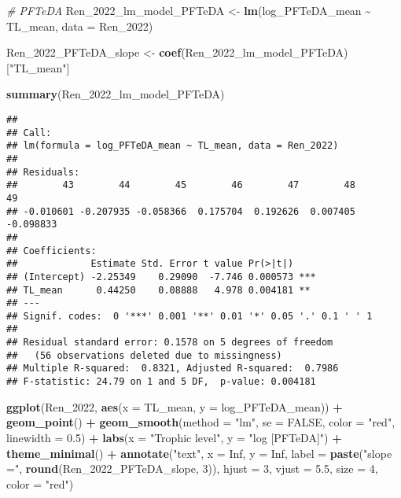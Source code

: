 \documentclass[
]{article}
\newenvironment{Shaded}{\begin{snugshade}}{\end{snugshade}}
\newcommand{\AttributeTok}[1]{\textcolor[rgb]{0.13,0.29,0.53}{#1}}
\newcommand{\CommentTok}[1]{\textcolor[rgb]{0.56,0.35,0.01}{\textit{#1}}}
\newcommand{\ConstantTok}[1]{\textcolor[rgb]{0.56,0.35,0.01}{#1}}
\newcommand{\DecValTok}[1]{\textcolor[rgb]{0.00,0.00,0.81}{#1}}
\newcommand{\FloatTok}[1]{\textcolor[rgb]{0.00,0.00,0.81}{#1}}
\newcommand{\FunctionTok}[1]{\textcolor[rgb]{0.13,0.29,0.53}{\textbf{#1}}}
\newcommand{\NormalTok}[1]{#1}
\newcommand{\OtherTok}[1]{\textcolor[rgb]{0.56,0.35,0.01}{#1}}
\newcommand{\SpecialCharTok}[1]{\textcolor[rgb]{0.81,0.36,0.00}{\textbf{#1}}}
\newcommand{\StringTok}[1]{\textcolor[rgb]{0.31,0.60,0.02}{#1}}
\begin{document}
\begin{Shaded}
\begin{Highlighting}[]
\CommentTok{\# PFTeDA}
\NormalTok{Ren\_2022\_lm\_model\_PFTeDA }\OtherTok{\textless{}{-}} \FunctionTok{lm}\NormalTok{(log\_PFTeDA\_mean }\SpecialCharTok{\textasciitilde{}}\NormalTok{ TL\_mean,}
                              \AttributeTok{data =}\NormalTok{ Ren\_2022)}

\NormalTok{Ren\_2022\_PFTeDA\_slope }\OtherTok{\textless{}{-}} \FunctionTok{coef}\NormalTok{(Ren\_2022\_lm\_model\_PFTeDA)[}\StringTok{"TL\_mean"}\NormalTok{]}

\FunctionTok{summary}\NormalTok{(Ren\_2022\_lm\_model\_PFTeDA)}
\end{Highlighting}
\end{Shaded}

\begin{verbatim}
## 
## Call:
## lm(formula = log_PFTeDA_mean ~ TL_mean, data = Ren_2022)
## 
## Residuals:
##        43        44        45        46        47        48        49 
## -0.010601 -0.207935 -0.058366  0.175704  0.192626  0.007405 -0.098833 
## 
## Coefficients:
##             Estimate Std. Error t value Pr(>|t|)    
## (Intercept) -2.25349    0.29090  -7.746 0.000573 ***
## TL_mean      0.44250    0.08888   4.978 0.004181 ** 
## ---
## Signif. codes:  0 '***' 0.001 '**' 0.01 '*' 0.05 '.' 0.1 ' ' 1
## 
## Residual standard error: 0.1578 on 5 degrees of freedom
##   (56 observations deleted due to missingness)
## Multiple R-squared:  0.8321, Adjusted R-squared:  0.7986 
## F-statistic: 24.79 on 1 and 5 DF,  p-value: 0.004181
\end{verbatim}

\begin{Shaded}
\begin{Highlighting}[]
\FunctionTok{ggplot}\NormalTok{(Ren\_2022, }\FunctionTok{aes}\NormalTok{(}\AttributeTok{x =}\NormalTok{ TL\_mean, }\AttributeTok{y =}\NormalTok{ log\_PFTeDA\_mean)) }\SpecialCharTok{+}
  \FunctionTok{geom\_point}\NormalTok{() }\SpecialCharTok{+}
  \FunctionTok{geom\_smooth}\NormalTok{(}\AttributeTok{method =} \StringTok{"lm"}\NormalTok{, }\AttributeTok{se =} \ConstantTok{FALSE}\NormalTok{, }\AttributeTok{color =} \StringTok{"red"}\NormalTok{, }\AttributeTok{linewidth =} \FloatTok{0.5}\NormalTok{) }\SpecialCharTok{+}
  \FunctionTok{labs}\NormalTok{(}\AttributeTok{x =} \StringTok{"Trophic level"}\NormalTok{,}
       \AttributeTok{y =} \StringTok{"log [PFTeDA]"}\NormalTok{) }\SpecialCharTok{+}
  \FunctionTok{theme\_minimal}\NormalTok{() }\SpecialCharTok{+}
  \FunctionTok{annotate}\NormalTok{(}\StringTok{"text"}\NormalTok{, }\AttributeTok{x =} \ConstantTok{Inf}\NormalTok{, }\AttributeTok{y =} \ConstantTok{Inf}\NormalTok{, }\AttributeTok{label =} \FunctionTok{paste}\NormalTok{(}\StringTok{"slope ="}\NormalTok{, }\FunctionTok{round}\NormalTok{(Ren\_2022\_PFTeDA\_slope, }\DecValTok{3}\NormalTok{)), }
           \AttributeTok{hjust =} \DecValTok{3}\NormalTok{, }\AttributeTok{vjust =} \FloatTok{5.5}\NormalTok{, }\AttributeTok{size =} \DecValTok{4}\NormalTok{, }\AttributeTok{color =} \StringTok{"red"}\NormalTok{)}
\end{Highlighting}
\end{Shaded}
\end{document}
